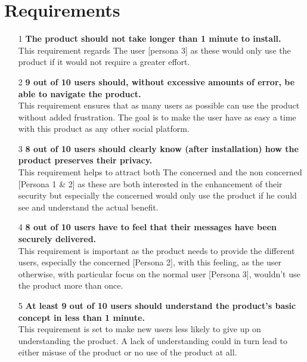 \section{Requirements}
\begin{itemize}
    \item[1] \textbf{The product should not take longer than 1 minute to install.} \hfill \\ 
    This requirement regards The user [persona 3] as these would only use the product if it would not require a greater effort.
    \item[2] \textbf{9 out of 10 users should, without excessive amounts of error, be able to navigate the product.} \hfill \\ 
    This requirement ensures that as many users as possible can use the product without added frustration. The goal is to make the user have as easy a time with this product as any other social platform.
    \item[3] \textbf{8 out of 10 users should clearly know (after installation) how the product preserves their privacy.} \hfill \\
    This requirement helps to attract both The concerned and the non concerned [Persona 1 \& 2] as these are both interested in the enhancement of their security but especially the concerned would only use the product if he could see and understand the actual benefit.
    \item[4] \textbf{8 out of 10 users have to feel that their messages have been securely delivered.} \hfill \\
    This requirement is important as the product needs to provide the different users, especially the concerned [Persona 2], with this feeling, as the user otherwise, with particular focus on the normal user [Persona 3], wouldn't use the product more than once.
    \item[5] \textbf{At least 9 out of 10 users should understand the product's basic concept in less than 1 minute.} \hfill \\ 
    This requirement is set to make new users less likely to give up on understanding the product. A lack of understanding could in turn lead to either misuse of the product or no use of the product at all.
\end{itemize}
